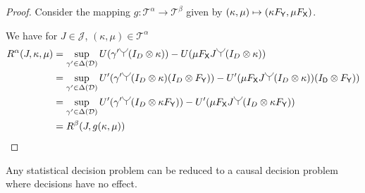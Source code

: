 \begin{proof}
Consider the mapping $g:\mathscr{T}^\alpha\to\mathscr{T}^\beta$ given by $(\kappa,\mu)\mapsto (\kappa F_{\mathsf{Y}},\mu F_{\mathsf{X}})$.

We have for $J\in \mathscr{J}$, $(\kappa,\mu)\in\mathscr{T}^\alpha$
\begin{align}
    R^\alpha(J,\kappa,\mu) &= \sup_{\gamma'\in\Delta(\mathcal{D})} U(\gamma'\splitter{0.15}(I_D\otimes\kappa)) - U(\mu F_{\RV{X}} J\splitter{0.15}(I_D\otimes\kappa))\\
                           &= \sup_{\gamma'\in\Delta(\mathcal{D})} U'(\gamma'\splitter{0.15}(I_D\otimes\kappa)(I_D \otimes  F_{\RV{Y}})) - U'(\mu F_{\RV{X}} J\splitter{0.15} (I_D\otimes\kappa))(I_{\RV{D}}\otimes F_{\RV{Y}}))\\
                           &= \sup_{\gamma'\in\Delta(\mathcal{D})} U'(\gamma'\splitter{0.15}(I_D\otimes \kappa F_{\RV{Y}})) - U'(\mu F_{\RV{X}} J\splitter{0.15}(I_D\otimes \kappa F_{\RV{Y}}))\\
                           &= R^\beta (J,g(\kappa,\mu))
\end{align}
\end{proof}

Any statistical decision problem can be reduced to a causal decision problem where decisions have no effect.

